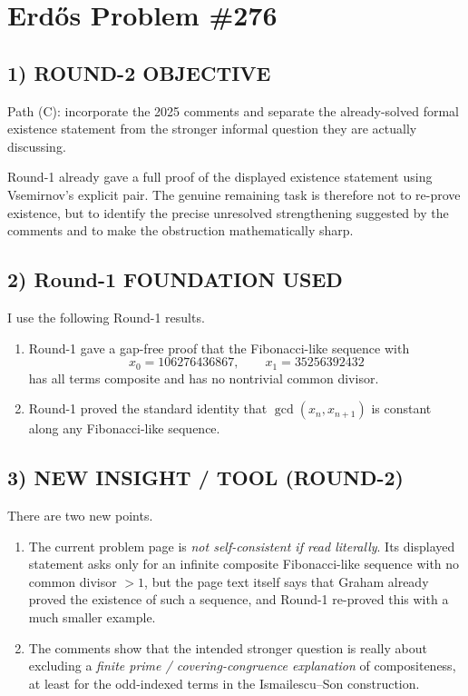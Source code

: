 \section*{Erd\H{o}s Problem \#276}

\subsection*{1) ROUND-2 OBJECTIVE}

Path (C): incorporate the 2025 comments and separate the already-solved formal existence statement from the stronger informal question they are actually discussing.

Round-1 already gave a full proof of the displayed existence statement using Vsemirnov's explicit pair.  The genuine remaining task is therefore not to re-prove existence, but to identify the precise unresolved strengthening suggested by the comments and to make the obstruction mathematically sharp.

\subsection*{2) Round-1 FOUNDATION USED}

I use the following Round-1 results.

\begin{enumerate}
\item Round-1 gave a gap-free proof that the Fibonacci-like sequence with
\[
x_0=106276436867,\qquad x_1=35256392432
\]
has all terms composite and has no nontrivial common divisor.
\item Round-1 proved the standard identity that $\gcd(x_n,x_{n+1})$ is constant along any Fibonacci-like sequence.
\end{enumerate}

\subsection*{3) NEW INSIGHT / TOOL (ROUND-2)}

There are two new points.

\begin{enumerate}
\item The current problem page is \emph{not self-consistent if read literally}.  Its displayed statement asks only for an infinite composite Fibonacci-like sequence with no common divisor $>1$, but the page text itself says that Graham already proved the existence of such a sequence, and Round-1 re-proved this with a much smaller example.
\item The comments show that the intended stronger question is really about excluding a \emph{finite prime / covering-congruence explanation} of compositeness, at least for the odd-indexed terms in the Ismailescu--Son construction.
\end{enumerate}

